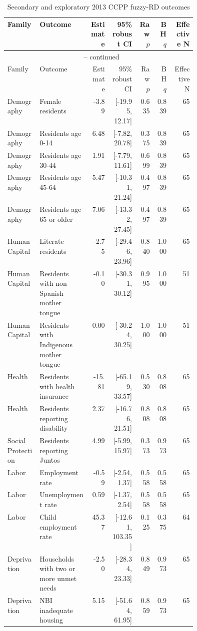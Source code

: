 \begin{longtable}{p{0.17\linewidth}p{0.27\linewidth}rrrrr}
\caption{Secondary and exploratory 2013 CCPP fuzzy-RD outcomes}
\label{tab:rd_outcomes_secondary_2013_ccpp} \\
\toprule
Family & Outcome & Estimate & 95\% robust CI & Raw \(p\) & BH \(q\) & Effective N \\
\midrule
\endfirsthead
\multicolumn{7}{c}{\tablename\ \thetable{} -- continued} \\
\toprule
Family & Outcome & Estimate & 95\% robust CI & Raw \(p\) & BH \(q\) & Effective N \\
\midrule
\endhead
Demography & Female residents & -3.89 & [-19.95, 12.17] & 0.635 & 0.839 & 65 \\
Demography & Residents age 0-14 & 6.48 & [-7.82, 20.78] & 0.375 & 0.839 & 65 \\
Demography & Residents age 30-44 & 1.91 & [-7.79, 11.61] & 0.699 & 0.839 & 65 \\
Demography & Residents age 45-64 & 5.47 & [-10.31, 21.24] & 0.497 & 0.839 & 65 \\
Demography & Residents age 65 or older & 7.06 & [-13.32, 27.45] & 0.497 & 0.839 & 65 \\
Human Capital & Literate residents & -2.75 & [-29.46, 23.96] & 0.840 & 1.000 & 65 \\
Human Capital & Residents with non-Spanish mother tongue & -0.10 & [-30.31, 30.12] & 0.995 & 1.000 & 51 \\
Human Capital & Residents with Indigenous mother tongue & 0.00 & [-30.24, 30.25] & 1.000 & 1.000 & 51 \\
Health & Residents with health insurance & -15.81 & [-65.19, 33.57] & 0.530 & 0.808 & 65 \\
Health & Residents reporting disability & 2.37 & [-16.76, 21.51] & 0.808 & 0.808 & 65 \\
Social Protection & Residents reporting Juntos & 4.99 & [-5.99, 15.97] & 0.373 & 0.973 & 65 \\
Labor & Employment rate & -0.59 & [-2.54, 1.37] & 0.558 & 0.558 & 65 \\
Labor & Unemployment rate & 0.59 & [-1.37, 2.54] & 0.558 & 0.558 & 65 \\
Labor & Child employment rate & 45.37 & [-12.61, 103.35] & 0.125 & 0.375 & 64 \\
Deprivation & Households with two or more unmet needs & -2.50 & [-28.34, 23.33] & 0.849 & 0.973 & 65 \\
Deprivation & NBI inadequate housing & 5.15 & [-51.64, 61.95] & 0.859 & 0.973 & 65 \\

\end{longtable}
